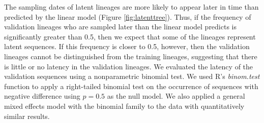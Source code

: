 \documentclass{bmcart}
\begin{document}

The sampling dates of latent lineages are more likely to appear later in time than predicted by the linear model (Figure \ref{fig:latenttree}).
Thus, if the frequency of validation lineages who are sampled later than the linear model predicts is significantly greater than 0.5, then we expect that some of the lineages represent latent sequences.
If this frequency is closer to 0.5, however, then the validation lineages cannot be distinguished from the training lineages, suggesting that there is little or no latency in the validation lineages.
We evaluated the latency of the validation sequences using a nonparametric binomial test.
We used R's {\it binom.test} function to apply a right-tailed binomial test on the occurrence of sequences with negative difference using $p=0.5$ as the null model.
We also applied a general mixed effects model with the binomial family to the data with quantitatively similar results.



\end{document}
